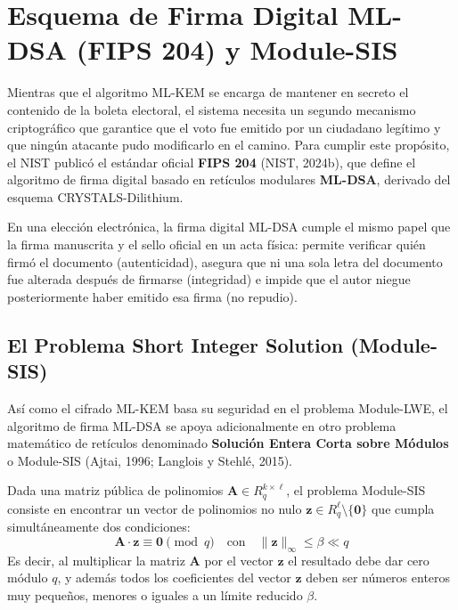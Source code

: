 \section{Esquema de Firma Digital ML-DSA (FIPS 204) y Module-SIS}

Mientras que el algoritmo ML-KEM se encarga de mantener en secreto el contenido de la boleta electoral, el sistema necesita un segundo mecanismo criptográfico que garantice que el voto fue emitido por un ciudadano legítimo y que ningún atacante pudo modificarlo en el camino. Para cumplir este propósito, el NIST publicó el estándar oficial \textbf{FIPS 204} (NIST, 2024b), que define el algoritmo de firma digital basado en retículos modulares \textbf{ML-DSA}, derivado del esquema CRYSTALS-Dilithium.

En una elección electrónica, la firma digital ML-DSA cumple el mismo papel que la firma manuscrita y el sello oficial en un acta física: permite verificar quién firmó el documento (autenticidad), asegura que ni una sola letra del documento fue alterada después de firmarse (integridad) e impide que el autor niegue posteriormente haber emitido esa firma (no repudio).

\subsection{El Problema Short Integer Solution (Module-SIS)}

Así como el cifrado ML-KEM basa su seguridad en el problema Module-LWE, el algoritmo de firma ML-DSA se apoya adicionalmente en otro problema matemático de retículos denominado \textbf{Solución Entera Corta sobre Módulos} o Module-SIS (Ajtai, 1996; Langlois y Stehlé, 2015).

Dada una matriz pública de polinomios $\mathbf{A} \in R_q^{k \times \ell}$, el problema Module-SIS consiste en encontrar un vector de polinomios no nulo $\mathbf{z} \in R_q^\ell \setminus \{\mathbf{0}\}$ que cumpla simultáneamente dos condiciones:
\begin{equation}
	\mathbf{A} \cdot \mathbf{z} \equiv \mathbf{0} \pmod q \quad \text{con} \quad \|\mathbf{z}\|_\infty \le \beta \ll q
\end{equation}
Es decir, al multiplicar la matriz $\mathbf{A}$ por el vector $\mathbf{z}$ el resultado debe dar cero módulo $q$, y además todos los coeficientes del vector $\mathbf{z}$ deben ser números enteros muy pequeños, menores o iguales a un límite reducido $\beta$.

